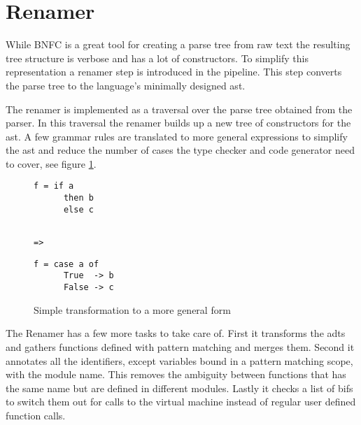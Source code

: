 \section{Renamer}

While BNFC is a great tool for creating a parse tree from raw text the resulting tree structure is verbose and has a lot of constructors. To simplify this representation a renamer step is introduced in the pipeline. This step converts the parse tree to the language's minimally designed \gls{ast}. 

The renamer is implemented as a traversal over the parse tree obtained from the parser. In this traversal the renamer builds up a new tree of constructors for the \gls{ast}. A few grammar rules are translated to more general expressions to simplify the \gls{ast} and reduce the number of cases the type checker and code generator need to cover, see figure \ref{lst:renamer1}.

\begin{figure}[ht]
\centering
{}%
\begin{minipage}[t]{0.30\linewidth}
    \centering
    \begin{lstlisting}
f = if a
      then b
      else c
    \end{lstlisting}
\end{minipage}
\begin{minipage}[t]{0.09\linewidth}
    \centering
    \begin{lstlisting}

=>
    \end{lstlisting}
\end{minipage}
\begin{minipage}[t]{0.30\linewidth}
    \centering
    \begin{lstlisting}
f = case a of
      True  -> b
      False -> c
    \end{lstlisting}
\end{minipage}
\caption{Simple transformation to a more general form}
\label{lst:renamer1}
\end{figure}

The Renamer has a few more tasks to take care of. First it transforms the \glspl{adt} and gathers functions defined with pattern matching and merges them. Second it annotates all the identifiers, except variables bound in a pattern matching scope, with the module name. This removes the ambiguity between functions that has the same name but are defined in different modules. Lastly it checks a list of \glspl{bif} to switch them out for calls to the virtual machine instead of regular user defined function calls.

